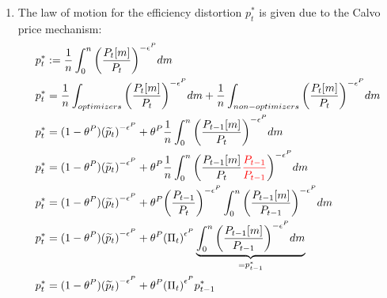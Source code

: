 \begin{enumerate}
\item
The law of motion for the efficiency distortion \(p_{t}^{*}\) is given due to the Calvo price mechanism:
\begin{align*}
p_{t}^{*} &:= \frac{1}{n} \int_{0}^{n} {\left(\frac{P_{t}[m]}{P_{t}}\right)}^{-\epsilon^{P}} dm
\\
p_{t}^{*} & = \frac{1}{n} \int_{optimizers}     {\left(\frac{P_{t}[m]}{P_{t}}\right)}^{-\epsilon^{P}} dm
            + \frac{1}{n} \int_{non-optimizers} {\left(\frac{P_{t}[m]}{P_{t}}\right)}^{-\epsilon^{P}} dm
\\
p_{t}^{*} & = (1-\theta^{P}) {(\widetilde{p}_{t})}^{-\epsilon^{P}} + \theta^{P} \frac{1}{n} \int_{0}^{n} {\left(\frac{P_{t-1}[m]}{P_t}\right)}^{-\epsilon^{P}} dm
\\
p_{t}^{*} & = (1-\theta^{P}) {(\widetilde{p}_{t})}^{-\epsilon^{P}} + \theta^{P} \frac{1}{n} \int_{0}^{n} {\left(\frac{P_{t-1}[m]}{P_t } {\color{red}\frac{P_{t-1}}{P_{t-1}}}\right)}^{-\epsilon^{P}} dm
\\
p_{t}^{*} & = (1-\theta^{P}) {(\widetilde{p}_{t})}^{-\epsilon^{P}} + \theta^{P} {\left(\frac{P_{t-1}}{P_{t}}\right)}^{-\epsilon^{P}} \int_{0}^{n} {\left(\frac{P_{t-1}[m]}{P_{t-1} }\right)}^{-\epsilon^{P}} dm
\\
p_{t}^{*} & = (1-\theta^{P}) {(\widetilde{p}_{t})}^{-\epsilon^{P}} + \theta^{P} {(\Pi_{t})}^{\epsilon^{P}} \underbrace{\int_{0}^{n} {\left(\frac{P_{t-1}[m]}{P_{t-1} }\right)}^{-\epsilon^{P}} dm}_{=p_{t-1}^{*}}
\\
p_{t}^{*} & = (1-\theta^{P}) {(\widetilde{p}_{t})}^{-\epsilon^{P}} + \theta^{P} {(\Pi_{t})}^{\epsilon^{P}} p_{t-1}^{*}
\end{align*}

\end{enumerate}